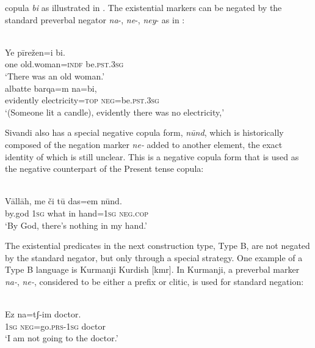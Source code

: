 \documentclass[output=paper,colorlinks,citecolor=brown]{langscibook}
\begin{document}
copula \textit{bi} as illustrated in . The existential
markers can be negated by the standard preverbal negator \textit{na}-,
\textit{ne}-, \textit{ney}- as in :
%
\begin{exe}\ex\label{ex:ieur-sivandi-woman}
\\
    \gll Ye    pīrežen=i                 bi. \\
one old.woman=\textsc{indf}   be.\textsc{pst.3sg} \\
    \glt `There was an old woman.'
\ex\label{ex:ieur-sivandi-electricity}
\\
    \gll albatte   barqa=m      na=bi, \\ %
evidently   electricity=\textsc{top}   \textsc{neg}=be.\textsc{pst.3sg} \\
    \glt `(Someone lit a candle), evidently there was no electricity,'
    \end{exe}
%
Sivandi also has a special negative copula form, \textit{nūnd}, which is historically composed of the negation marker \textit{ne-} added to another element, the exact identity of which is still unclear. This is a negative copula form that is used as the negative counterpart of the Present tense copula:
%
\begin{exe}\ex\label{ex:ieur-sivandi-hand}
\\
    \gll Vāllāh, me    či     tū das=em      nūnd. \\
by.god  \textsc{1sg}  what in hand=\textsc{1sg}   \textsc{neg.cop} \\
    \glt `By God, there's nothing in my hand.'
    \end{exe}
%
The existential predicates in the next construction type, Type B, are not
negated by the standard negator, but only through a special strategy. One
example of a Type B language is Kurmanji Kurdish [kmr]. In Kurmanji, a
preverbal marker \textit{na-}, \textit{ne-}, considered to be either a
prefix or clitic, is used for standard negation:
%
\begin{exe}\ex
{}\\  
    \gll Ez      na=tʃ-im             doctor. \\
\textsc{1sg}   \textsc{neg}=go.\textsc{prs}-\textsc{1sg}    doctor \\
    \glt `I am not going to the doctor.'
    \end{exe}
\end{document}
